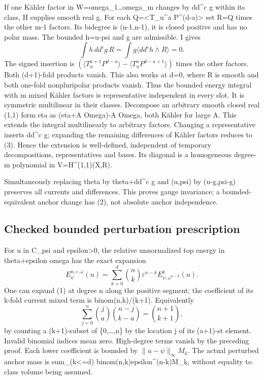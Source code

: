 \documentclass[
]{article}
\begin{document}
If one Kähler factor in W=omega\_1\ldots omega\_m changes by dd\^{}c g
within its class, H supplies smooth real g. For each
Q=\textless T\_u\^{}a P\^{}(d-a)\textgreater{} set R=Q times the other
m-1 factors. Its bidegree is (n-1,n-1), it is closed positive and has no
polar mass. The bounded h=u-psi and g are admissible. I gives \[
\int h\,dd^cg\,R
=\int g\langle dd^ch\mathbin{\dot\wedge}R\rangle=0.\tag{3}
\] The signed insertion is
\((\langle T_u^{a+1}P^{d-a}\rangle-\langle T_u^a P^{d-a+1}\rangle)\)
times the other factors. Both (d+1)-fold products vanish. This also
works at d=0, where R is smooth and both one-fold nonpluripolar products
vanish. Thus the bounded energy integral with m mixed Kähler factors is
representative independent in every slot. It is symmetric multilinear in
their classes. Decompose an arbitrary smooth closed real (1,1) form eta
as (eta+A Omega)-A Omega, both Kähler for large A. This extends the
integral multilinearly to arbitrary factors. Changing a representative
inserts dd\^{}c g; expanding the remaining differences of Kähler factors
reduces to (3). Hence the extension is well-defined, independent of
temporary decompositions, representatives and bases. Its diagonal is a
homogeneous degree-m polynomial in V=H\^{}(1,1)(X,R).

Simultaneously replacing theta by theta+dd\^{}c g and (u,psi) by
(u-g,psi-g) preserves all currents and differences. This proves gauge
invariance; a bounded-equivalent anchor change has (2), not absolute
anchor independence.

\subsection{Checked bounded perturbation
prescription}\label{checked-bounded-perturbation-prescription}

For u in C\_psi and epsilon\textgreater0, the relative unnormalized top
energy in theta+epsilon omega has the exact expansion \[
E^{n,\varepsilon,\omega}_\psi(u)
=\sum_{k=0}^d\binom nk\varepsilon^{n-k}E^k_{\psi,\omega^{n-k}}(u).\tag{4}
\] One can expand (1) at degree n along the positive segment; the
coefficient of its k-fold current mixed term is binom(n,k)/(k+1).
Equivalently \[
\sum_{j=0}^n\binom ja\binom{n-j}{k-a}=\binom{n+1}{k+1},
\] by counting a (k+1)-subset of \{0,\ldots,n\} by the location j of its
(a+1)-st element. Invalid binomial indices mean zero. High-degree terms
vanish by the preceding proof. Each lower coefficient is bounded by
\(\|u-\psi\|_\infty M_k\). The actual perturbed anchor mass is
sum\_(k\textless=d) binom(n,k)epsilon\^{}(n-k)M\_k, without equality to
class volume being assumed.
\end{document}
